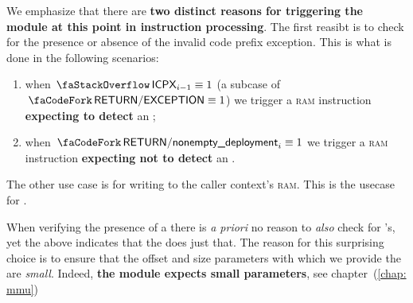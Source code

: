 \saNote{} \label{hub: instruction handling: halting: return: desired trigger flags}
We emphasize that there are \textbf{two distinct reasons for triggering the \mmuMod{} module at this point in instruction processing}.
The first reasibt is to check for the presence or absence of the invalid code prefix exception.
This is what is done in the following scenarios:
\begin{enumerate}
	\item when $\stackIcpx _{i - 1} \equiv 1$ (a subcase of $\scenReturnException \equiv 1$) we trigger a \textsc{ram} instruction \textbf{expecting to detect} an \icpxSH{};
	\item when $\scenReturnNonemptyDeployment _{i} \equiv 1$ we trigger a \textsc{ram} instruction \textbf{expecting not to detect} an \icpxSH{}.
\end{enumerate}
The other use case is for writing to the caller context's \textsc{ram}.
This is the usecase for \scenReturnFromMessageCallWillTouchRam{}.

\saNote{} \label{hub: instruction handling: halting: return: why icpx requires an mxp instruction}
When verifying the presence of a \icpxSH{} there is \emph{a priori} no reason to \emph{also} check for \mxpxSH{}'s, yet the above indicates that the \zkEvm{} does just that.
The reason for this surprising choice is to ensure that the offset and size parameters with which we provide the \mmuMod{} are \emph{small}.
Indeed, \textbf{the \mmuMod{} module expects small parameters}, see chapter~(\ref{chap: mmu})

